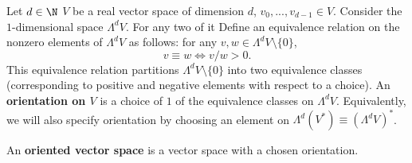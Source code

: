 \begin{definition}
  Let
    $d \in \N$
    $V$ be a real vector space of dimension $d$,
    $v_0, ..., v_{d - 1} \in V$.
  Consider the $1$-dimensional space $\Lambda^d V$.
  For any two of it
  Define an equivalence relation on the nonzero elements of $\Lambda^d V$
  as follows: for any $v, w \in \Lambda^d V \setminus \{0\}$,
  \begin{equation}
    v \equiv w \Leftrightarrow v / w > 0.
  \end{equation}
  This equivalence relation partitions $\Lambda^d V \setminus \{0\}$ into two
  equivalence classes
  (corresponding to positive and negative elements with respect to a choice).
  An \textbf{orientation on $V$} is a choice of $1$ of the equivalence classes
  on $\Lambda^d V$.
  Equivalently, we will also specify orientation by choosing an element on
  $\Lambda^d (V^*) \equiv (\Lambda^d V)^*$.

  An \textbf{oriented vector space} is a vector space with a chosen orientation.
\end{definition}
